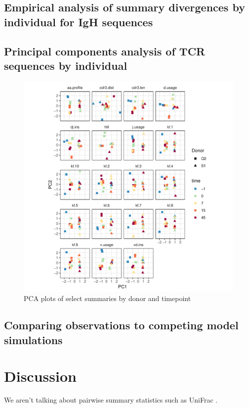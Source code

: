 \documentclass{article}
\begin{document}
\subsection*{Empirical analysis of summary divergences by individual for IgH sequences}

\subsection*{Principal components analysis of TCR sequences by individual}

\begin{figure}
    \includegraphics[width=\linewidth]{Figures/tcr_pca.pdf}
    \caption{PCA plots of select summaries by donor and timepoint}
    \label{fig:TCR_PCA}
\end{figure}

\subsection*{Comparing observations to competing model simulations}

\section*{Discussion}
We aren't talking about pairwise summary statistics such as UniFrac \cite{De_Bourcy2017-pu}.
\end{document}
